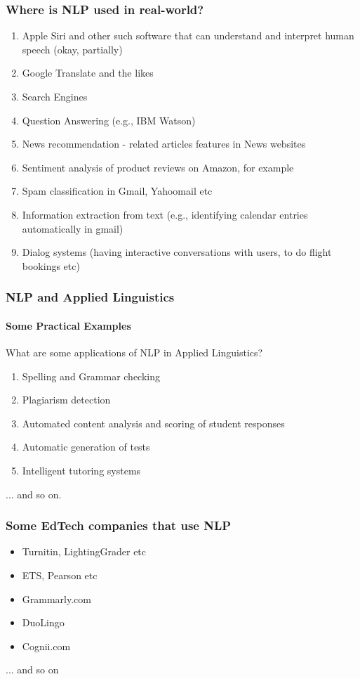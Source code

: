 \documentclass{beamer}
\begin{document}
\begin{frame}
\frametitle{Where is NLP used in real-world?}
\begin{enumerate}
\item Apple Siri and other such software that can understand and interpret human speech (okay, partially)
\item Google Translate and the likes
\item Search Engines
\item Question Answering (e.g., IBM Watson)
\item News recommendation - related articles features in News websites
\item Sentiment analysis of product reviews on Amazon, for example
\item Spam classification in Gmail, Yahoomail etc
\item Information extraction from text (e.g., identifying calendar entries automatically in gmail)
\item Dialog systems (having interactive conversations with users, to do flight bookings etc)
\end{enumerate}
\end{frame}

\begin{frame}
\frametitle{NLP and Applied Linguistics}
\framesubtitle{Some Practical Examples}
What are some applications of NLP in Applied Linguistics? \pause
\begin{enumerate}
\item Spelling and Grammar checking 
\item Plagiarism detection
\item Automated content analysis and scoring of student responses
\item Automatic generation of tests 
\item Intelligent tutoring systems 
\end{enumerate}
... and so on.
\end{frame}

\begin{frame}
\frametitle{Some EdTech companies that use NLP}
\begin{itemize}
\item Turnitin, LightingGrader etc
\item ETS, Pearson etc
\item Grammarly.com
\item DuoLingo
\item Cognii.com
\end{itemize}
... and so on
\end{frame}
\end{document}
